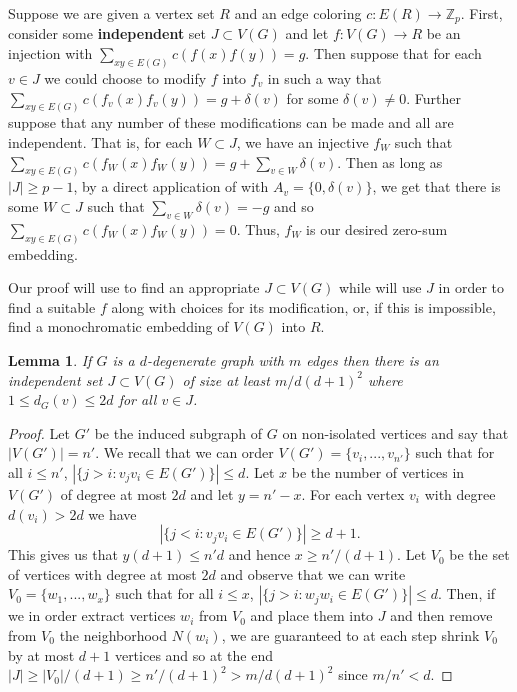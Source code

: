 \documentclass{article}
\newtheorem{lemma}[theorem]{Lemma}
\theoremstyle{definition}
\begin{document}
Suppose we are given a vertex set $R$ and an edge coloring $c:E(R)\to \mathbb{Z}_p$. First, consider some \textbf{independent} set $J\subset V(G)$ and let $f:V(G) \to R$ be an injection with $\sum_{xy\in E(G)}c(f(x)f(y))=g$. Then suppose that for each $v\in J$ we could choose to modify $f$ into $f_v$ in such a way that $\sum_{xy\in E(G)}c(f_v(x)f_v(y))=g+\delta(v)$ for some $\delta(v)\neq 0$. Further suppose that any number of these modifications can be made and all are independent. That is, for each $W\subset J$, we have an injective $f_{W}$ such that $\sum_{xy\in E(G)}c(f_W(x)f_W(y))=g+\sum _{v\in W}\delta(v)$. Then as long as $|J|\geq p-1$, by a direct application of  with $A_v=\{0,\delta(v)\}$, we get that there is some $W\subset J$ such that $\sum_{v\in W}\delta(v)=-g$ and so $\sum_{xy\in E(G)}c(f_W(x)f_W(y))=0$. Thus, $f_W$ is our desired zero-sum embedding.

Our proof will use  to find an appropriate $J\subset V(G)$ while  will use $J$ in order to find a suitable $f$ along with choices for its modification, or, if this is impossible, find a monochromatic embedding of $V(G)$ into $R$.  

\begin{lemma}\label{blueprint_extraction}
If $G$ is a $d$-degenerate graph with $m$ edges then there is an independent set $J\subset V(G)$ of size at least $m/d(d+1)^2$ where $1\leq d_G(v)\leq 2d$ for all $v\in J$.
\end{lemma}
\begin{proof}
Let $G'$ be the induced subgraph of $G$ on non-isolated vertices and say that $|V(G')|=n'$. We recall that we can order $V(G')=\{v_i,...,v_{n'}\}$ such that for all $i\leq n'$, $|\{j>i:v_jv_i\in E(G')\}|\leq d$. Let $x$ be the number of vertices in $V(G')$ of degree at most $2d$ and let $y=n'-x$. For each vertex $v_i$ with  degree $d(v_i)>2d$ we have $$|\{j<i:v_jv_i\in E(G')\}|\geq d+1.$$ This gives us that $y(d+1)\leq n'd$ and hence $x\geq n'/(d+1)$. Let $V_0$ be the set of vertices with degree at most $2d$ and observe that we can write $V_0=\{w_1,...,w_{x}\}$ such that for all $i\leq x$, $|\{j>i:w_jw_i\in E(G')\}|\leq d$. Then, if we in order extract vertices $w_i$ from $V_0$ and place them into $J$ and then remove from $V_0$ the neighborhood $N(w_i)$, we are guaranteed to at each step shrink $V_0$ by at most $d+1$ vertices and so at the end $|J|\geq  |V_0|/(d+1)\geq n'/(d+1)^2> m/d(d+1)^2$ since $m/n'< d$.
\end{proof}
\end{document}
